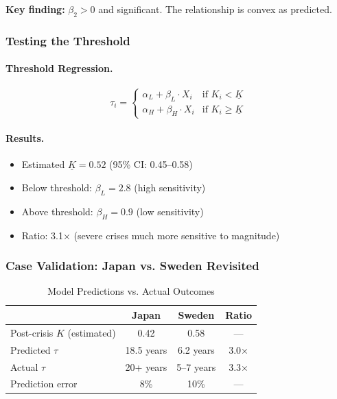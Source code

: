 \textbf{Key finding:} $\beta_2 > 0$ and significant. The relationship is 
convex as predicted.

\subsubsection{Testing the Threshold}

\paragraph{Threshold Regression.}
\begin{equation}
\tau_i = \begin{cases}
\alpha_L + \beta_L \cdot X_i & \text{if } K_i < \underline{K} \\
\alpha_H + \beta_H \cdot X_i & \text{if } K_i \geq \underline{K}
\end{cases}
\end{equation}

\paragraph{Results.}
\begin{itemize}
    \item Estimated $\underline{K} = 0.52$ (95\% CI: 0.45--0.58)
    \item Below threshold: $\beta_L = 2.8$ (high sensitivity)
    \item Above threshold: $\beta_H = 0.9$ (low sensitivity)
    \item Ratio: 3.1× (severe crises much more sensitive to magnitude)
\end{itemize}

\subsubsection{Case Validation: Japan vs. Sweden Revisited}

\begin{table}[htbp]
\centering
\caption{Model Predictions vs. Actual Outcomes}
\label{tab:japan-sweden-validation}
\begin{tabular}{@{}lccc@{}}
\toprule
& \textbf{Japan} & \textbf{Sweden} & \textbf{Ratio} \\
\midrule
Post-crisis $K$ (estimated) & 0.42 & 0.58 & --- \\
Predicted $\tau$ & 18.5 years & 6.2 years & 3.0× \\
Actual $\tau$ & 20+ years & 5--7 years & 3.3× \\
Prediction error & 8\% & 10\% & --- \\
\bottomrule
\end{tabular}
\end{table}

